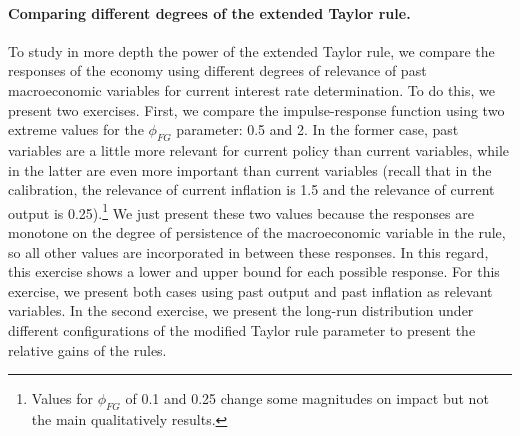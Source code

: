 \documentclass[11pt]{article}
\numberwithin{equation}{section}
\begin{document}
\paragraph{Comparing different degrees of the extended Taylor rule.} To study in more depth the power of the extended Taylor rule, we compare the responses of the economy using different degrees of relevance of past macroeconomic variables for current interest rate determination. To do this, we present two exercises. First, we compare the impulse-response function using two extreme values for the $\phi_{FG}$ parameter: 0.5 and 2. In the former case, past variables are a little more relevant for current policy than current variables, while in the latter are even more important than current variables (recall that in the calibration, the relevance of current inflation is 1.5 and the relevance of current output is 0.25).\footnote{Values for $\phi_{FG}$ of 0.1 and 0.25 change some magnitudes on impact but not the main qualitatively results.} We just present these two values because the responses are monotone on the degree of persistence of the macroeconomic variable in the rule, so all other values are incorporated in between these responses. In this regard, this exercise shows a lower and upper bound for each possible response. For this exercise, we present both cases using past output and past inflation as relevant variables. In the second exercise, we present the long-run distribution under different configurations of the modified Taylor rule parameter to present the relative gains of the rules.
\end{document}
